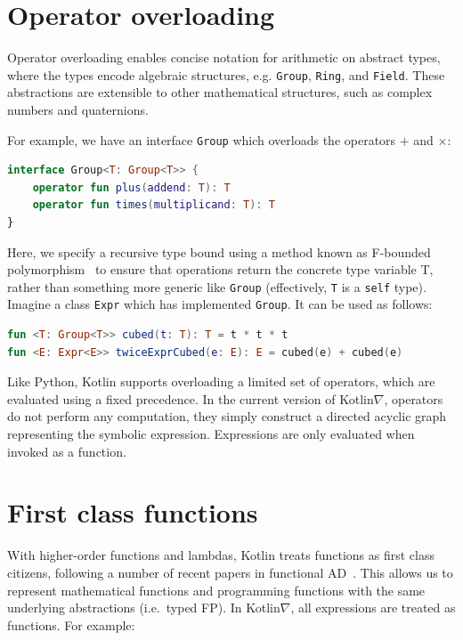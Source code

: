 \documentclass[12pt,initial,twoside,maitrise]{dms}
\def\inline{\lstinline[basicstyle=\ttfamily]}
\numberwithin{equation}{section}
\numberwithin{table}{chapter}
\numberwithin{figure}{chapter}
\begin{document}
\section{Operator overloading}\label{sec:operator-overloading}

\noindent Operator overloading enables concise notation for arithmetic on abstract types, where the types encode algebraic structures, e.g. \inline{Group}, \inline{Ring}, and \inline{Field}. These abstractions are extensible to other mathematical structures, such as complex numbers and quaternions.

For example, we have an interface \inline{Group} which overloads the operators $+$ and $\times$:
%
\begin{lstlisting}[language=Kotlin]
interface Group<T: Group<T>> {
    operator fun plus(addend: T): T
    operator fun times(multiplicand: T): T
}
\end{lstlisting}
%
Here, we specify a recursive type bound using a method known as F-bounded polymorphism~\cite{canning1989f} to ensure that operations return the concrete type variable T, rather than something more generic like \inline{Group} (effectively, \inline{T} is a \inline{self} type). Imagine a class \inline{Expr} which has implemented \inline{Group}. It can be used as follows:
%
\begin{lstlisting}[language=Kotlin]
fun <T: Group<T>> cubed(t: T): T = t * t * t
fun <E: Expr<E>> twiceExprCubed(e: E): E = cubed(e) + cubed(e)
\end{lstlisting}
%
Like Python, Kotlin supports overloading a limited set of operators, which are evaluated using a fixed precedence. In the current version of Kotlin$\nabla$, operators do not perform any computation, they simply construct a directed acyclic graph representing the symbolic expression. Expressions are only evaluated when invoked as a function.

\section{First class functions}\label{sec:first-class-functions}

With higher-order functions and lambdas, Kotlin treats functions as first class citizens, following a number of recent papers in functional AD~\cite{pearlmutter2008reverse,wang2018backpropagation}. This allows us to represent mathematical functions and programming functions with the same underlying abstractions (i.e.\ typed FP). In Kotlin$\nabla$, all expressions are treated as functions. For example:
\end{document}
